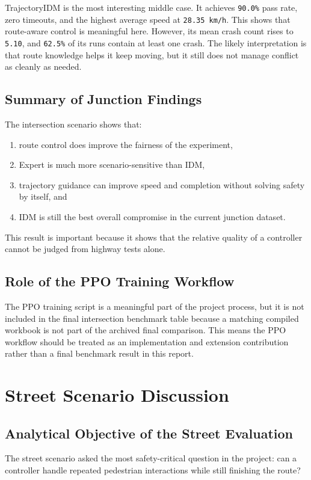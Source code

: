 \documentclass[12pt,a4paper]{report}
\begin{document}
TrajectoryIDM is the most interesting middle case. It achieves \texttt{90.0\%} pass rate, zero timeouts, and the highest average speed at \texttt{28.35 km/h}. This shows that route-aware control is meaningful here. However, its mean crash count rises to \texttt{5.10}, and \texttt{62.5\%} of its runs contain at least one crash. The likely interpretation is that route knowledge helps it keep moving, but it still does not manage conflict as cleanly as needed.

\subsection{Summary of Junction Findings}
The intersection scenario shows that:

\begin{enumerate}[label=\arabic*.]
    \item route control does improve the fairness of the experiment,
    \item Expert is much more scenario-sensitive than IDM,
    \item trajectory guidance can improve speed and completion without solving safety by itself, and
    \item IDM is still the best overall compromise in the current junction dataset.
\end{enumerate}

This result is important because it shows that the relative quality of a controller cannot be judged from highway tests alone.

\subsection{Role of the PPO Training Workflow}
The PPO training script is a meaningful part of the project process, but it is not included in the final intersection benchmark table because a matching compiled workbook is not part of the archived final comparison. This means the PPO workflow should be treated as an implementation and extension contribution rather than a final benchmark result in this report.

\section{Street Scenario Discussion}

\subsection{Analytical Objective of the Street Evaluation}
The street scenario asked the most safety-critical question in the project: can a controller handle repeated pedestrian interactions while still finishing the route?
\end{document}
